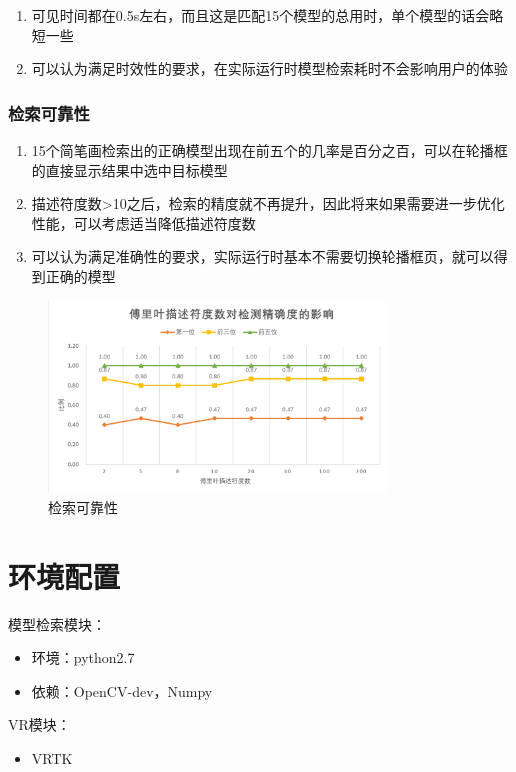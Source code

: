 \documentclass{article}
\begin{document}
\begin{enumerate}
    \item 可见时间都在0.5s左右，而且这是匹配15个模型的总用时，单个模型的话会略短一些
    \item 可以认为满足时效性的要求，在实际运行时模型检索耗时不会影响用户的体验
\end{enumerate}

\subsubsection{检索可靠性}

\begin{enumerate}
    \item 15个简笔画检索出的正确模型出现在前五个的几率是百分之百，可以在轮播框的直接显示结果中选中目标模型
    \item 描述符度数>10之后，检索的精度就不再提升，因此将来如果需要进一步优化性能，可以考虑适当降低描述符度数
    \item 可以认为满足准确性的要求，实际运行时基本不需要切换轮播框页，就可以得到正确的模型
\end{enumerate}

\begin{figure}[htb]
    \centering
    \includegraphics[width=0.8\textwidth]{images/precision.png}
    \caption{检索可靠性}\label{fig:digit}
\end{figure} 


\section{环境配置}
模型检索模块：
\begin{itemize}
    \item 环境：python2.7
    \item 依赖：OpenCV-dev，Numpy
\end{itemize}

VR模块：
\begin{itemize}
    \item VRTK
\end{itemize}
\end{document}
